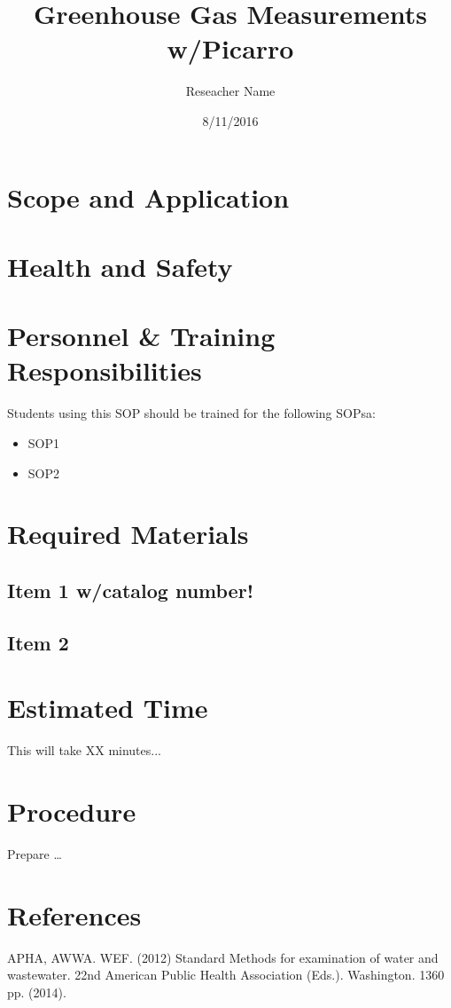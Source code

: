 \documentclass[12pt]{../SOP_Test}
\title{Greenhouse Gas Measurements w/Picarro}
\date{8/11/2016}
\author{Reseacher Name}
\begin{document}


\maketitle

\section{Scope and Application}


\NP \lipsum[1]

\section{Health and Safety}

\NP \lipsum[2]


\section{Personnel \& Training Responsibilities}

\NP \lipsum[1]

Students using this SOP should be trained for the following SOPsa:

\begin{itemize}
  \item SOP1
  \item SOP2
\end{itemize}


\section{Required Materials}

\subsection{Item 1 w/catalog number!}
\subsection{Item 2}

\section{Estimated Time}

\NP This will take XX minutes...

\section{Procedure}

\NP Prepare \dots

\NP

\section{References}

\NP APHA, AWWA. WEF. (2012) Standard Methods for examination of water and wastewater. 22nd American Public Health Association (Eds.). Washington. 1360 pp. (2014).
\end{document}
